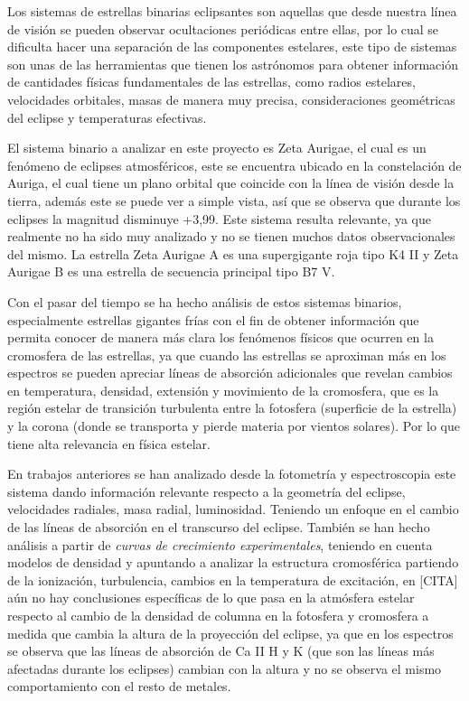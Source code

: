 \documentclass[11pt]{article}
\begin{document}
\noindent Los sistemas de estrellas binarias eclipsantes son aquellas que desde nuestra línea de visión se pueden observar ocultaciones periódicas entre ellas, por lo cual se dificulta hacer una separación de las componentes estelares, este tipo de sistemas son unas de las herramientas que tienen los astrónomos para obtener información de cantidades físicas fundamentales de las estrellas, como radios estelares, velocidades orbitales, masas de manera muy precisa, consideraciones geométricas del eclipse y temperaturas efectivas.
\vspace{2mm}

\noindent El sistema binario a analizar en este proyecto es Zeta Aurigae, el cual es un fenómeno de eclipses atmosféricos, este se encuentra ubicado en la constelación de Auriga, el cual tiene un plano orbital que coincide con la línea de visión desde la tierra, además este se puede ver a simple vista, así que se observa que durante los eclipses la magnitud disminuye +3,99. Este sistema resulta relevante, ya que realmente no ha sido muy analizado y no se tienen muchos datos observacionales del mismo. La estrella Zeta Aurigae A es una supergigante roja tipo K4 II y Zeta Aurigae B es una estrella de secuencia principal tipo B7 V.
\vspace{2mm}

\noindent Con el pasar del tiempo se ha hecho análisis de estos sistemas binarios, especialmente estrellas gigantes frías con el fin de obtener información que permita conocer de manera más clara los fenómenos físicos que ocurren en la cromosfera de las estrellas, ya que cuando las estrellas se aproximan más en los espectros se pueden apreciar líneas de absorción adicionales que revelan cambios en temperatura, densidad, extensión y movimiento de la cromosfera, que es la región estelar de transición turbulenta entre la fotosfera (superficie de la estrella) y la corona (donde se transporta y pierde materia por vientos solares). Por lo que tiene alta relevancia en física estelar.

\noindent En trabajos anteriores se han analizado desde la fotometría y espectroscopia este sistema  dando información relevante respecto a la geometría del eclipse, velocidades radiales, masa radial, luminosidad. Teniendo un enfoque en el cambio de las líneas de absorción en el transcurso del eclipse. También se han hecho análisis a partir de \textit{curvas de crecimiento experimentales}, teniendo en cuenta modelos de densidad y apuntando a analizar la estructura cromosférica partiendo de la ionización, turbulencia, cambios en la temperatura de excitación, en [CITA] aún no hay conclusiones específicas de lo que pasa en la atmósfera estelar respecto al cambio de la densidad de columna en la fotosfera y cromosfera a medida que cambia la altura de la proyección del eclipse, ya que en los espectros se observa que las líneas de absorción de Ca II H y K (que son las líneas más afectadas durante los eclipses) cambian con la altura y no se observa el mismo comportamiento con el resto de metales.
\end{document}
